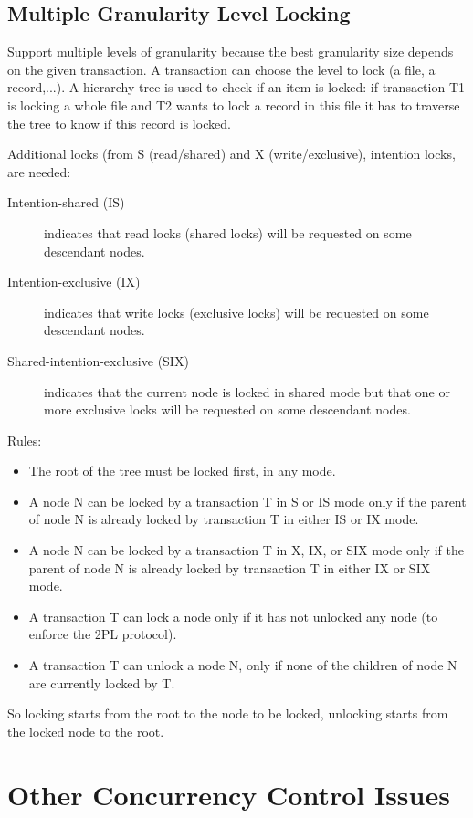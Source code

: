 \subsection{Multiple Granularity Level Locking}
Support multiple levels of granularity because the best granularity size depends on the given transaction. A transaction can choose the level to lock (a file, a record,...). A hierarchy tree is used to check if an item is locked: if transaction T1 is locking a whole file and T2 wants to lock a record in this file it has to traverse the tree to know if this record is locked.

Additional locks (from S (read/shared) and X (write/exclusive), intention locks, are needed:
\begin{description}
    \item[Intention-shared (IS)] indicates that read locks (shared locks) will be requested on some descendant nodes.
    \item[Intention-exclusive (IX)] indicates that write locks (exclusive locks) will be requested on some descendant nodes.
    \item[Shared-intention-exclusive (SIX)] indicates that the current node is locked in shared mode but that one or more exclusive locks will be requested on some descendant nodes.
\end{description}

Rules:
\begin{itemize}
    \item The root of the tree must be locked first, in any mode.
    \item A node N can be locked by a transaction T in S or IS mode only if the parent of node N is already locked by transaction T in either IS or IX mode.
    \item A node N can be locked by a transaction T in X, IX, or SIX mode only if the parent of node N is already locked by transaction T in either IX or SIX mode.
    \item A transaction T can lock a node only if it has not unlocked any node (to enforce the 2PL protocol).
    \item A transaction T can unlock a node N, only if none of the children of node N are currently locked by T.
\end{itemize}

So locking starts from the root to the node to be locked, unlocking starts from the locked node to the root.

\section{Other Concurrency Control Issues}
